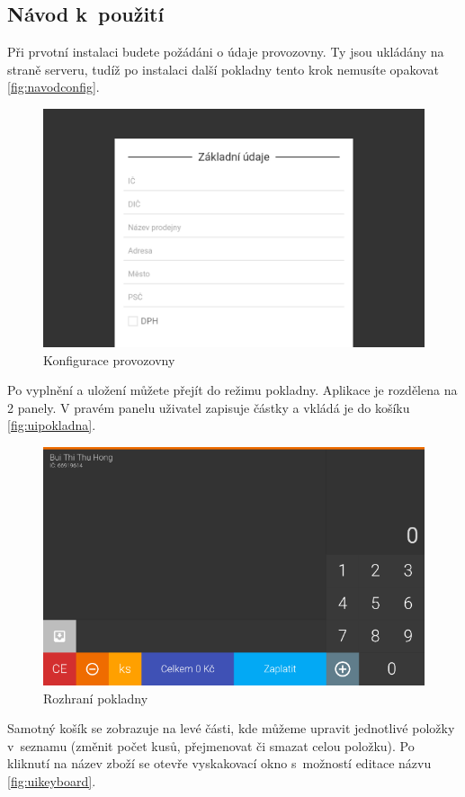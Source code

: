 \documentclass[a4paper,11pt,oneside]{article}
\begin{document}
\subsection{Návod k~použití}

Při prvotní instalaci budete požádáni o údaje provozovny. Ty jsou ukládány na straně serveru, tudíž po instalaci další pokladny tento krok nemusíte opakovat \eqref{fig:navodconfig}.

\begin{figure}[H]
	\centering
	\includegraphics[width=0.7\linewidth]{../navod_config}
	\caption{Konfigurace provozovny}
	\label{fig:navodconfig}
\end{figure}


Po vyplnění a uložení můžete přejít do režimu pokladny. Aplikace je rozdělena na 2 panely. V pravém panelu uživatel zapisuje částky a vkládá je do košíku \eqref{fig:uipokladna}. 

\begin{figure}[H]
	\centering
	\includegraphics[width=0.7\linewidth]{../ui_pokladna}
	\caption{Rozhraní pokladny}
	\label{fig:uipokladna}
\end{figure}


Samotný košík se zobrazuje na levé části, kde můžeme upravit jednotlivé položky v~seznamu (změnit počet kusů, přejmenovat či smazat celou položku). Po kliknutí na název zboží se otevře vyskakovací okno s~možností editace názvu \eqref{fig:uikeyboard}.
\end{document}
